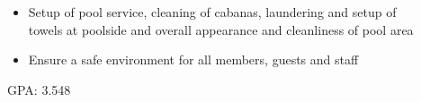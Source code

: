 \documentclass[10pt,letter,ragged2e,withhyper]{altacv}
\begin{document}
\begin{paracol}{2}
\divider

\begin{itemize}
\item Setup of pool service, cleaning of cabanas, laundering and setup of \\ towels at poolside and overall appearance and cleanliness of pool area
\item Ensure a safe environment for all members, guests and staff
\end{itemize}










\switchcolumn


GPA: 3.548

\divider




\end{paracol}
\end{document}
